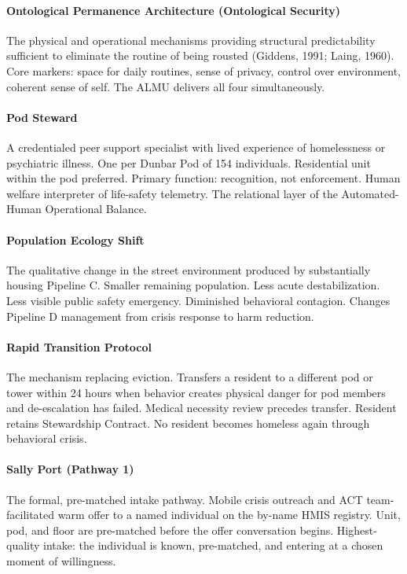 {\paragraph{Ontological Permanence Architecture (Ontological Security)} The physical and operational mechanisms providing structural predictability sufficient to eliminate the routine of being rousted (Giddens, 1991; Laing, 1960). Core markers: space for daily routines, sense of privacy, control over environment, coherent sense of self. The ALMU delivers all four simultaneously.

\paragraph{Pod Steward} A credentialed peer support specialist with lived experience of homelessness or psychiatric illness. One per Dunbar Pod of 154 individuals. Residential unit within the pod preferred. Primary function: recognition, not enforcement. Human welfare interpreter of life-safety telemetry. The relational layer of the Automated-Human Operational Balance.

\paragraph{Population Ecology Shift} The qualitative change in the street environment produced by substantially housing Pipeline C. Smaller remaining population. Less acute destabilization. Less visible public safety emergency. Diminished behavioral contagion. Changes Pipeline D management from crisis response to harm reduction.

\paragraph{Rapid Transition Protocol} The mechanism replacing eviction. Transfers a resident to a different pod or tower within 24 hours when behavior creates physical danger for pod members and de-escalation has failed. Medical necessity review precedes transfer. Resident retains Stewardship Contract. No resident becomes homeless again through behavioral crisis.

\paragraph{Sally Port (Pathway 1)} The formal, pre-matched intake pathway. Mobile crisis outreach and ACT team-facilitated warm offer to a named individual on the by-name HMIS registry. Unit, pod, and floor are pre-matched before the offer conversation begins. Highest-quality intake: the individual is known, pre-matched, and entering at a chosen moment of willingness.

}
